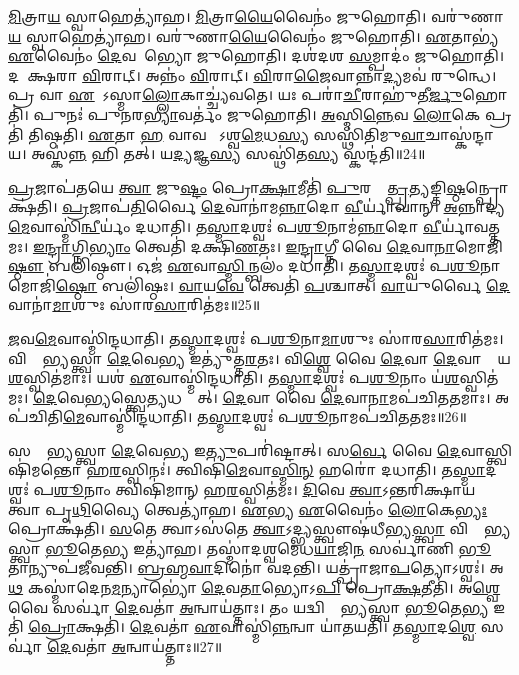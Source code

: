 \ul{𑌮𑌿}𑌤𑍍𑌰𑌾\ul{𑌯} 𑌸𑍍𑌵𑌾𑌹𑍇𑌤𑍍𑌯𑌾॑𑌹।
\ul{𑌮𑌿}𑌤𑍍𑌰𑌾\ul{𑌯𑍈}𑌵𑍈𑌨𑌂॑ 𑌜𑍁𑌹𑍋𑌤𑌿।
𑌵𑌰𑍁॑𑌣𑌾\ul{𑌯} 𑌸𑍍𑌵𑌾𑌹𑍇𑌤𑍍𑌯𑌾॑𑌹।
𑌵𑌰𑍁॑𑌣𑌾\ul{𑌯𑍈}𑌵𑍈𑌨𑌂॑ 𑌜𑍁𑌹𑍋𑌤𑌿।
\ul{𑌏}𑌤𑌾𑌭𑍍𑌯॑ \ul{𑌏}𑌵𑍈𑌨𑌂॑ \ul{𑌦𑍇}𑌵𑌤𑌾᳚𑌭𑍍𑌯𑍋 𑌜𑍁𑌹𑍋𑌤𑌿।
𑌦𑌶॑𑌦𑌶 \ul{𑌸}𑌮𑍍𑌪𑌾𑌦𑌂॑ 𑌜𑍁𑌹𑍋𑌤𑌿।
𑌦𑌶𑌾᳚𑌕𑍍𑌷𑌰𑌾 \ul{𑌵𑌿}𑌰𑌾𑌟𑍍।
𑌅𑌨𑍍𑌨𑌂॑ \ul{𑌵𑌿}𑌰𑌾𑌟𑍍।
\ul{𑌵𑌿}𑌰𑌾\ul{𑌜𑍈}𑌵𑌾𑌨𑍍𑌨𑌾\ul{𑌦𑍍𑌯}𑌮𑌵॑ 𑌰𑍁𑌨𑍍𑌧𑍇।
𑌪𑍍𑌰 𑌵𑌾 \ul{𑌏}𑌷𑍋᳚\-𑌽𑌸𑍍𑌮𑌾\ul{𑌲𑍍𑌲𑍋}𑌕𑌾𑌚𑍍𑌚𑍍𑌯॑𑌵𑌤𑍇।
𑌯𑌃 𑌪𑌰𑌾॑\ul{𑌚𑍀}𑌰𑌾𑌹𑍁॑𑌤𑍀\ul{𑌰𑍍𑌜𑍁}𑌹𑍋𑌤𑌿॑।
𑌪𑍁𑌨𑌃॑ 𑌪𑍁𑌨𑌰\ul{𑌭𑍍𑌯𑌾}𑌵𑌰𑍍𑌤𑌂॑ 𑌜𑍁𑌹𑍋𑌤𑌿।
\ul{𑌅}𑌸𑍍𑌮𑌿\ul{𑌨𑍍𑌨𑍇}𑌵 \ul{𑌲𑍋}𑌕𑍇 𑌪𑍍𑌰𑌤𑌿॑ 𑌤𑌿𑌷𑍍𑌠𑌤𑌿।
\ul{𑌏}𑌤𑌾 \ul{𑌹} 𑌵𑌾𑌵 𑌸𑍋᳚\-𑌽𑌶𑍍𑌵\ul{𑌮𑍇}𑌧\ul{𑌸𑍍𑌯} 𑌸𑌸𑍍𑌥𑌿॑𑌤𑌿𑌮𑍁\ul{𑌵𑌾}𑌚𑌾𑌸𑍍𑌕॑𑌨𑍍𑌦𑌾𑌯।
𑌅𑌸𑍍𑌕॑\ul{𑌨𑍍𑌨}\ul{} 𑌹𑌿 𑌤𑌤𑍍।
𑌯\ul{𑌦𑍍𑌯}𑌜𑍍𑌞\ul{𑌸𑍍𑌯} 𑌸𑌸𑍍𑌥𑌿॑𑌤\ul{𑌸𑍍𑌯} 𑌸𑍍𑌕𑌨𑍍𑌦॑𑌤𑌿॥24॥\anuvakamend[\ul{𑌅}𑌭𑌿𑌜𑌿॑𑌤𑍍𑌯𑍈 𑌵𑍈𑌶𑍍𑌵𑌾\ul{𑌨}𑌰𑌃 𑌸॑\ul{𑌵𑌿}𑌤𑍍𑌰 \ul{𑌏}𑌵𑍈𑌨𑌂॑ 𑌜𑍁𑌹𑍋𑌤𑌿 \ul{𑌵𑌾}𑌯𑌵॑ \ul{𑌏}𑌵𑍈𑌨𑌂॑ 𑌜𑍁𑌹𑍋𑌤𑌿 𑌚𑍍𑌯𑌵\ul{𑌤𑍇} 𑌷𑌟𑍍 𑌚॑]

\ul{𑌪𑍍𑌰}𑌜𑌾𑌪॑𑌤𑌯𑍇 \ul{𑌤𑍍𑌵𑌾} 𑌜𑍁\ul{𑌷𑍍𑌟𑌂} 𑌪𑍍𑌰𑍋\ul{𑌕𑍍𑌷𑌾}𑌮𑍀𑌤𑌿॑ \ul{𑌪𑍁}𑌰𑌸𑍍𑌤𑌾᳚\ul{𑌤𑍍𑌪𑍍𑌰}𑌤𑍍𑌯𑌙𑍍𑌤𑌿\ul{𑌷𑍍𑌠}𑌨𑍍𑌪𑍍𑌰𑍋𑌕𑍍𑌷॑𑌤𑌿।
\ul{𑌪𑍍𑌰}𑌜𑌾𑌪॑\ul{𑌤𑌿}𑌰𑍍𑌵𑍈 \ul{𑌦𑍇}𑌵𑌾𑌨𑌾॑𑌮\ul{𑌨𑍍𑌨𑌾}𑌦𑍋 \ul{𑌵𑍀}𑌰𑍍𑌯𑌾॑𑌵𑌾𑌨𑍍।
\ul{𑌅}𑌨𑍍𑌨𑌾𑌦𑍍𑌯॑\ul{𑌮𑍇}𑌵𑌾𑌸𑍍𑌮𑌿॑\ul{𑌨𑍍𑌵𑍀}𑌰𑍍𑌯𑌂॑ 𑌦𑌧𑌾𑌤𑌿।
𑌤\ul{𑌸𑍍𑌮𑌾}𑌦𑌶𑍍𑌵𑌃॑ 𑌪\ul{𑌶𑍂}𑌨𑌾𑌮॑\ul{𑌨𑍍𑌨𑌾}𑌦𑍋 \ul{𑌵𑍀}𑌰𑍍𑌯𑌾॑𑌵𑌤𑍍𑌤𑌮𑌃।
\ul{𑌇}\ul{𑌨𑍍𑌦𑍍𑌰𑌾}𑌗𑍍𑌨𑌿\ul{𑌭𑍍𑌯𑌾𑌂} 𑌤𑍍𑌵𑍇𑌤𑌿॑ 𑌦𑌕𑍍𑌷𑌿\ul{𑌣}𑌤𑌃।
\ul{𑌇}\ul{𑌨𑍍𑌦𑍍𑌰𑌾}𑌗𑍍𑌨𑍀 𑌵𑍈 \ul{𑌦𑍇}𑌵𑌾\ul{𑌨𑌾}𑌮𑍋𑌜𑌿॑\ul{𑌷𑍍𑌠𑍗} 𑌬𑌲𑌿॑𑌷𑍍𑌠𑍗।
𑌓𑌜॑ \ul{𑌏}𑌵𑌾\ul{𑌸𑍍𑌮𑌿}𑌨𑍍𑌬𑌲𑌂॑ 𑌦𑌧𑌾𑌤𑌿।
𑌤\ul{𑌸𑍍𑌮𑌾}𑌦𑌶𑍍𑌵𑌃॑ 𑌪\ul{𑌶𑍂}𑌨𑌾𑌮𑍋𑌜𑌿॑\ul{𑌷𑍍𑌠𑍋} 𑌬𑌲𑌿॑𑌷𑍍𑌠𑌃।
\ul{𑌵𑌾}𑌯\ul{𑌵𑍇} 𑌤𑍍𑌵𑍇𑌤𑌿॑ \ul{𑌪}𑌶𑍍𑌚𑌾𑌤𑍍।
\ul{𑌵𑌾}𑌯𑍁𑌰𑍍𑌵𑍈 \ul{𑌦𑍇}𑌵𑌾𑌨𑌾॑\ul{𑌮𑌾}𑌶𑍁𑌃 𑌸𑌾॑𑌰\ul{𑌸𑌾}𑌰𑌿𑌤॑𑌮𑌃॥25॥

\ul{𑌜}𑌵\ul{𑌮𑍇}𑌵𑌾𑌸𑍍𑌮𑌿॑𑌨𑍍𑌦𑌧𑌾𑌤𑌿।
𑌤\ul{𑌸𑍍𑌮𑌾}𑌦𑌶𑍍𑌵𑌃॑ 𑌪\ul{𑌶𑍂}𑌨𑌾\ul{𑌮𑌾}𑌶𑍁𑌃 𑌸𑌾॑𑌰\ul{𑌸𑌾}𑌰𑌿𑌤॑𑌮𑌃।
𑌵𑌿𑌶𑍍𑌵𑍇᳚𑌭𑍍𑌯𑌸𑍍𑌤𑍍𑌵𑌾 \ul{𑌦𑍇}𑌵𑍇\ul{𑌭𑍍𑌯} 𑌇𑌤𑍍𑌯𑍁॑𑌤𑍍𑌤\ul{𑌰}𑌤𑌃।
𑌵𑌿\ul{𑌶𑍍𑌵𑍇} 𑌵𑍈 \ul{𑌦𑍇}𑌵𑌾 \ul{𑌦𑍇}𑌵𑌾𑌨𑌾𑌂᳚ 𑌯\ul{𑌶}𑌸𑍍𑌵𑌿𑌤॑𑌮𑌾𑌃।
𑌯𑌶॑ \ul{𑌏}𑌵𑌾𑌸𑍍𑌮𑌿॑𑌨𑍍𑌦𑌧𑌾𑌤𑌿।
𑌤\ul{𑌸𑍍𑌮𑌾}𑌦𑌶𑍍𑌵𑌃॑ 𑌪\ul{𑌶𑍂}𑌨𑌾𑌂 𑌯॑\ul{𑌶}𑌸𑍍𑌵𑌿𑌤॑𑌮𑌃।
\ul{𑌦𑍇}𑌵𑍇\ul{𑌭𑍍𑌯}𑌸𑍍𑌤𑍍𑌵𑍇\ul{𑌤𑍍𑌯}𑌧𑌸𑍍𑌤𑌾᳚𑌤𑍍।
\ul{𑌦𑍇}𑌵𑌾 𑌵𑍈 \ul{𑌦𑍇}𑌵𑌾\ul{𑌨𑌾}𑌮𑌪॑𑌚𑌿𑌤𑌤𑌮𑌾𑌃।
𑌅𑌪॑𑌚𑌿𑌤𑌿\ul{𑌮𑍇}𑌵𑌾𑌸𑍍𑌮𑌿॑𑌨𑍍𑌦𑌧𑌾𑌤𑌿।
𑌤\ul{𑌸𑍍𑌮𑌾}𑌦𑌶𑍍𑌵𑌃॑ 𑌪\ul{𑌶𑍂}𑌨𑌾𑌮𑌪॑𑌚𑌿𑌤𑌤𑌮𑌃॥26॥

𑌸𑌰𑍍𑌵𑍇᳚𑌭𑍍𑌯𑌸𑍍𑌤𑍍𑌵𑌾 \ul{𑌦𑍇}𑌵𑍇\ul{𑌭𑍍𑌯} 𑌇\ul{𑌤𑍍𑌯𑍁}𑌪𑌰𑌿॑𑌷𑍍𑌟𑌾𑌤𑍍।
𑌸\ul{𑌰𑍍𑌵𑍇} 𑌵𑍈 \ul{𑌦𑍇}𑌵𑌾𑌸𑍍𑌤𑍍𑌵𑌿𑌷𑌿॑𑌮𑌨𑍍𑌤𑍋 𑌹\ul{𑌰}𑌸𑍍𑌵𑌿𑌨𑌃॑।
𑌤𑍍𑌵𑌿𑌷𑌿॑\ul{𑌮𑍇}𑌵𑌾\ul{𑌸𑍍𑌮𑌿}\ul{𑌨𑍍} 𑌹𑌰𑍋॑ 𑌦𑌧𑌾𑌤𑌿।
𑌤\ul{𑌸𑍍𑌮𑌾}𑌦𑌶𑍍𑌵𑌃॑ 𑌪\ul{𑌶𑍂}𑌨𑌾𑌂 𑌤𑍍𑌵𑌿𑌷𑌿॑𑌮𑌾𑌨𑍍‌ 𑌹\ul{𑌰}𑌸𑍍𑌵𑌿𑌤॑𑌮𑌃।
\ul{𑌦𑌿}𑌵𑍇 \ul{𑌤𑍍𑌵𑌾}\-𑌽𑌨𑍍𑌤𑌰𑌿॑𑌕𑍍𑌷𑌾𑌯 𑌤𑍍𑌵𑌾 𑌪𑍃\ul{𑌥𑌿}𑌵𑍍𑌯𑍈 𑌤𑍍𑌵𑍇𑌤𑍍𑌯𑌾॑𑌹।
\ul{𑌏}𑌭𑍍𑌯 \ul{𑌏}𑌵𑍈𑌨𑌂॑ \ul{𑌲𑍋}𑌕𑍇\ul{𑌭𑍍𑌯𑌃} 𑌪𑍍𑌰𑍋𑌕𑍍𑌷॑𑌤𑌿।
\ul{𑌸}𑌤𑍇 𑌤𑍍𑌵𑌾\-𑌽𑌸॑𑌤𑍇 \ul{𑌤𑍍𑌵𑌾}\-𑌽𑌦𑍍𑌭𑍍𑌯𑌸𑍍𑌤𑍍𑌵𑍗𑌷॑𑌧𑍀𑌭𑍍𑌯\ul{𑌸𑍍𑌤𑍍𑌵𑌾} 𑌵𑌿𑌶𑍍𑌵𑍇᳚𑌭𑍍𑌯𑌸𑍍𑌤𑍍𑌵𑌾 \ul{𑌭𑍂}𑌤𑍇\ul{𑌭𑍍𑌯} 𑌇𑌤𑍍𑌯𑌾॑𑌹।
𑌤𑌸𑍍𑌮𑌾॑𑌦𑌶𑍍𑌵𑌮𑍇𑌧\ul{𑌯𑌾}𑌜𑌿\ul{𑌨}\ul{} 𑌸𑌰𑍍𑌵𑌾॑𑌣𑌿 \ul{𑌭𑍂}𑌤𑌾𑌨𑍍𑌯𑍁𑌪॑𑌜𑍀𑌵𑌨𑍍𑌤𑌿।
\ul{𑌬𑍍𑌰}\ul{𑌹𑍍𑌮}\ul{𑌵𑌾}𑌦𑌿𑌨𑍋॑ 𑌵𑌦𑌨𑍍𑌤𑌿।
𑌯𑌤𑍍𑌪𑍍𑌰𑌾॑𑌜𑌾\ul{𑌪}𑌤𑍍𑌯𑍋\-𑌽𑌶𑍍𑌵𑌃॑।
𑌅\ul{𑌥} 𑌕𑌸𑍍𑌮𑌾॑𑌦𑍇𑌨\ul{𑌮}𑌨𑍍𑌯𑌾𑌭𑍍𑌯𑍋॑ \ul{𑌦𑍇}𑌵\ul{𑌤𑌾}𑌭𑍍𑌯𑍋𑌽\ul{𑌪𑌿} 𑌪𑍍𑌰𑍋\ul{𑌕𑍍𑌷}𑌤𑍀𑌤𑌿॑।
𑌅\ul{𑌶𑍍𑌵𑍇} 𑌵𑍈 𑌸𑌰𑍍𑌵𑌾॑ \ul{𑌦𑍇}𑌵𑌤𑌾॑ \ul{𑌅}𑌨𑍍𑌵𑌾𑌯॑𑌤𑍍𑌤𑌾𑌃।
𑌤𑌂 𑌯𑌦𑍍𑌵𑌿𑌶𑍍𑌵𑍇᳚𑌭𑍍𑌯𑌸𑍍𑌤𑍍𑌵𑌾 \ul{𑌭𑍂}𑌤𑍇\ul{𑌭𑍍𑌯} 𑌇𑌤𑌿॑ \ul{𑌪𑍍𑌰𑍋}𑌕𑍍𑌷𑌤𑌿॑।
\ul{𑌦𑍇}𑌵𑌤𑌾॑ \ul{𑌏}𑌵𑌾𑌸𑍍𑌮𑌿॑\ul{𑌨𑍍𑌨}𑌨𑍍𑌵𑌾 𑌯𑌾॑𑌤𑌯𑌤𑌿।
𑌤\ul{𑌸𑍍𑌮𑌾}𑌦\ul{𑌶𑍍𑌵𑍇} 𑌸𑌰𑍍𑌵𑌾॑ \ul{𑌦𑍇}𑌵𑌤𑌾॑ \ul{𑌅}𑌨𑍍𑌵𑌾𑌯॑𑌤𑍍𑌤𑌾𑌃॥27॥\anuvakamend[\ul{𑌸𑌾}\ul{𑌰}\ul{𑌸𑌾}𑌰𑌿\ul{𑌤}𑌮𑍋\-𑌽𑌪॑𑌚𑌿𑌤𑌤𑌮𑌃 𑌪𑍍𑌰𑌾𑌜𑌾\ul{𑌪}𑌤𑍍𑌯𑍋\-𑌽\ul{𑌶𑍍𑌵𑌃} 𑌪𑌞𑍍𑌚॑ 𑌚]

